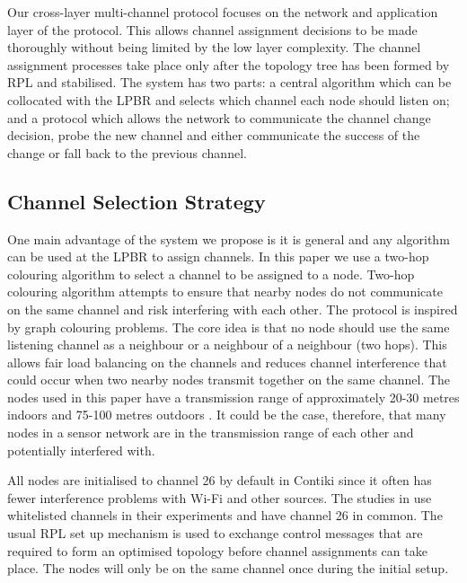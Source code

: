 Our cross-layer multi-channel protocol focuses on the network and application layer of the protocol. This allows channel assignment decisions to be made thoroughly without being limited by the low layer complexity. The channel assignment processes take place only after the topology tree has been formed by RPL and stabilised. The system has two parts: a central algorithm which can be collocated with the LPBR and selects which channel each node should listen on; and a protocol which allows the network to communicate the channel change decision, probe the new channel and either communicate the success of the change or fall back to the previous channel. 

\subsection{Channel Selection Strategy}

One main advantage of the system we propose is it is general and any algorithm can be used at the LPBR to assign channels. In this paper we use a two-hop colouring algorithm to select a channel to be assigned to a node. %
Two-hop colouring algorithm attempts to ensure that nearby nodes do not communicate on the same channel and risk interfering with each other. The protocol is inspired by graph colouring problems. The core idea is that no node should use the same listening channel as a neighbour or a neighbour of a neighbour (two hops).
This allows fair load balancing on the channels and reduces channel interference that could occur when two nearby nodes transmit together on the same channel. The nodes used in this paper have a transmission range of approximately 20-30 metres indoors and 75-100 metres outdoors \cite{telosb-datasheet}. It could be the case, therefore, that many nodes in a sensor network are in the transmission range of each other and potentially interfered with.
 
All nodes are initialised to channel 26 by default in Contiki since it often has fewer interference problems with Wi-Fi and other sources. The studies in \cite{chrysso, micmac, watteyne} use whitelisted channels in their experiments and have channel 26 in common. The usual RPL set up mechanism is used to exchange control messages that are required to form an optimised topology before channel assignments can take place. The nodes will only be on the same channel once during the initial setup.  
	
